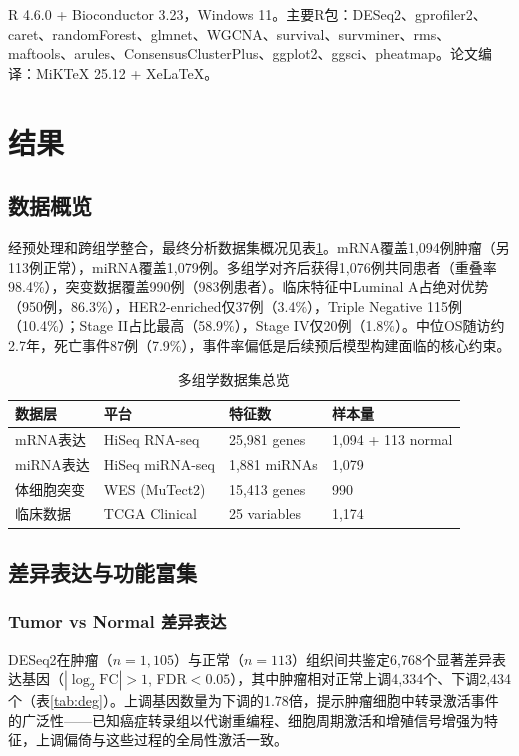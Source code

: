 \documentclass[12pt,a4paper]{ctexart}
\begin{document}
R 4.6.0 + Bioconductor 3.23，Windows 11。主要R包：DESeq2、gprofiler2、caret、randomForest、glmnet、WGCNA、survival、survminer、rms、maftools、arules、ConsensusClusterPlus、ggplot2、ggsci、pheatmap。论文编译：MiKTeX 25.12 + XeLaTeX。

\section{结果}

\subsection{数据概览}

经预处理和跨组学整合，最终分析数据集概况见表\ref{tab:data}。mRNA覆盖1,094例肿瘤（另113例正常），miRNA覆盖1,079例。多组学对齐后获得1,076例共同患者（重叠率98.4\%），突变数据覆盖990例（983例患者）。临床特征中Luminal A占绝对优势（950例，86.3\%），HER2-enriched仅37例（3.4\%），Triple Negative 115例（10.4\%）；Stage II占比最高（58.9\%），Stage IV仅20例（1.8\%）。中位OS随访约2.7年，死亡事件87例（7.9\%），事件率偏低是后续预后模型构建面临的核心约束。

\begin{table}[H]
\centering
\caption{多组学数据集总览}
\label{tab:data}
\begin{tabular}{llll}
\toprule
数据层 & 平台 & 特征数 & 样本量 \\
\midrule
mRNA表达 & HiSeq RNA-seq & 25,981 genes & 1,094 + 113 normal \\
miRNA表达 & HiSeq miRNA-seq & 1,881 miRNAs & 1,079 \\
体细胞突变 & WES (MuTect2) & 15,413 genes & 990 \\
临床数据 & TCGA Clinical & 25 variables & 1,174 \\
\bottomrule
\end{tabular}
\end{table}

\subsection{差异表达与功能富集}

\subsubsection{Tumor vs Normal 差异表达}

DESeq2在肿瘤（$n=1,105$）与正常（$n=113$）组织间共鉴定6,768个显著差异表达基因（$|\log_2\text{FC}|>1$, FDR$<0.05$），其中肿瘤相对正常上调4,334个、下调2,434个（表\ref{tab:deg}）。上调基因数量为下调的1.78倍，提示肿瘤细胞中转录激活事件的广泛性——已知癌症转录组以代谢重编程、细胞周期激活和增殖信号增强为特征，上调偏倚与这些过程的全局性激活一致。
\end{document}
